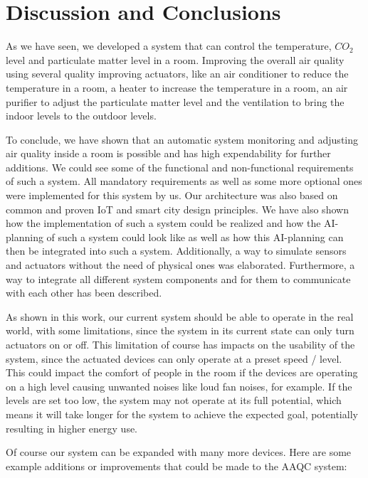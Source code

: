 \section{Discussion and Conclusions}\label{sec:discussion-and-conclusions}

As we have seen, we developed a system that can control the temperature, $CO_2$ level and particulate matter level in a room.
Improving the overall air quality using several quality improving actuators, like an air conditioner to reduce the temperature in a room, a heater to increase the temperature in a room, an air purifier to adjust the particulate matter level and the ventilation to bring the indoor levels to the outdoor levels.

To conclude, we have shown that an automatic system monitoring and adjusting air quality inside a room is possible and has high expendability for further additions.
We could see some of the functional and non-functional requirements of such a system.
All mandatory requirements as well as some more optional ones were implemented for this system by us.
Our architecture was also based on common and proven IoT and smart city design principles.
We have also shown how the implementation of such a system could be realized and how the AI-planning of such a system could look like as well as how this AI-planning can then be integrated into such a system.
Additionally, a way to simulate sensors and actuators without the need of physical ones was elaborated.
Furthermore, a way to integrate all different system components and for them to communicate with each other has been described.

As shown in this work, our current system should be able to operate in the real world, with some limitations, since the system in its current state can only turn actuators on or off.
This limitation of course has impacts on the usability of the system, since the actuated devices can only operate at a preset speed / level.
This could impact the comfort of people in the room if the devices are operating on a high level causing unwanted noises like loud fan noises, for example.
If the levels are set too low, the system may not operate at its full potential, which means it will take longer for the system to achieve the expected goal, potentially resulting in higher energy use.

\pagebreak

Of course our system can be expanded with many more devices.
Here are some example additions or improvements that could be made to the AAQC system:

